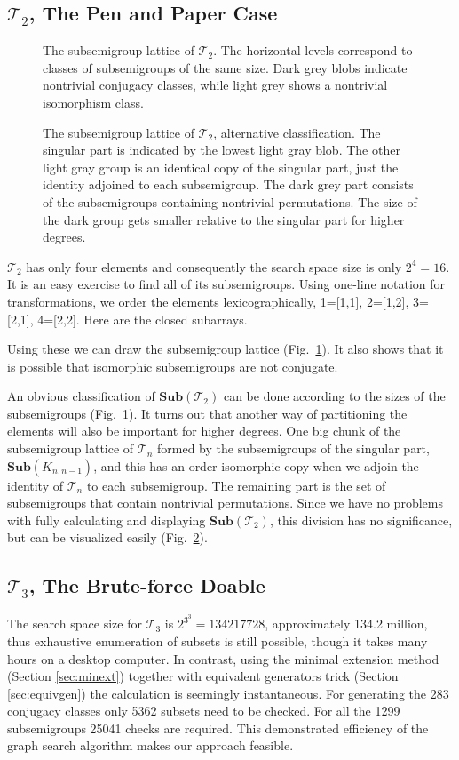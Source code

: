 \documentclass{amsart}
\newcommand{\cT}{{\mathcal T}}
\newcommand{\Sub}{\mathbf{Sub}}
\theoremstyle{plain}
\theoremstyle{definition}
\begin{document}
\subsection{$\cT_2$, The Pen and Paper Case}
\begin{figure}[t]

\caption{The subsemigroup lattice of $\cT_2$. The horizontal levels correspond to classes of subsemigroups of the same size.  Dark grey blobs indicate nontrivial conjugacy classes, while light grey shows a nontrivial isomorphism class.}
\label{fig:T2subs}
\end{figure}
\begin{figure}

\caption{The subsemigroup lattice of $\cT_2$, alternative classification. The singular part is indicated by the lowest light gray blob. The other light gray group is an identical copy of the singular part, just the identity adjoined to each subsemigroup. The dark grey part consists of the subsemigroups containing nontrivial permutations. The size of the dark group gets smaller relative to the singular part for higher degrees.}
\label{fig:T2subsAlt}
\end{figure}
$\cT_2$ has only four elements and consequently the search space size is only $2^4=16$.
It is an easy exercise to find all of its subsemigroups. 
Using one-line notation for transformations, we order the elements lexicographically, 1=[1,1], 2=[1,2], 3=[2,1], 4=[2,2]. Here are the closed subarrays.

Using these we can draw the subsemigroup lattice (Fig.\ \ref{fig:T2subs}).
It also shows that it is possible that isomorphic subsemigroups are not conjugate.

An obvious classification of $\Sub(\cT_2)$ can be done according to the sizes of the subsemigroups (Fig.\ \ref{fig:T2subs}).
It turns out that another way of partitioning the elements will also be important for higher degrees. 
One big chunk of the subsemigroup lattice of $\cT_n$ formed by the subsemigroups of the singular part, $\Sub(K_{n,n-1})$, and this has an order-isomorphic copy when we adjoin the identity of $\cT_n$ to each subsemigroup.
The remaining part is the set of subsemigroups that contain nontrivial permutations. 
Since we have no problems with fully calculating and displaying $\Sub(\cT_2)$, this division has no significance, but can be visualized easily (Fig.\ \ref{fig:T2subsAlt}).

\subsection{$\cT_3$, The Brute-force Doable}
The search space size for $\cT_3$ is $2^{3^3}=134217728$, approximately 134.2 million, thus exhaustive enumeration of subsets is still possible, though it takes many hours on a desktop computer.
In contrast, using the minimal extension method (Section \ref{sec:minext}) together with equivalent generators trick (Section \ref{sec:equivgen}) the calculation is seemingly instantaneous.
For generating the 283 conjugacy classes only 5362 subsets need to be checked. For all the 1299 subsemigroups 25041 checks are required. This demonstrated efficiency of the graph search algorithm makes our approach feasible.
\end{document}
